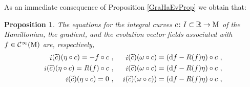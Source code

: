 \documentclass[12pt]{report}
\newtheorem{prop}[teor]{Proposition}
\def\bea{\begin{eqnarray}}
\def\eea{\end{eqnarray}}
\def\d{{\rm d}}
\def\Real{\mathbb{R}}
\def\inn{\mathop{i}\nolimits}
\begin{document}
As an immediate consequence of Proposition \ref{GraHaEvProp} we obtain that:

\begin{prop}
The equations for the integral curves $c\colon I\subset\Real\to {\rm M}$
of the Hamiltonian, the gradient, and the evolution vector fields associated with
$f\in\mathcal{C}^\infty({\rm M})$ are, respectively,
\bea
\label{hamilton-contactc-curves-eqs}
\inn(\widetilde c)(\eta\circ c)=-f\circ c \ & ,& \
\inn(\widetilde c)(\omega\circ c) = (\d f- R(f)\eta)\circ c\ ,  \\
 \inn(\widetilde c)(\eta\circ c) = R(f)\circ c \ & , &\
\inn(\widetilde c)(\omega\circ c)=(\d f-R(f)\eta)\circ c\ , \nonumber \\
\inn(\widetilde c)(\eta\circ c)=0 \ & ,& \ 
\inn(\widetilde c)(\omega\circ c))=(\d f-R(f)\eta)\circ c\ , \nonumber
\eea
\end{prop}
\end{document}
